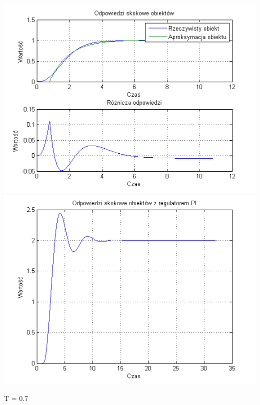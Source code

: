 \documentclass[10pt,a4paper]{article}
\begin{document}
\begin{center}
\includegraphics[scale=1]{images/jeden/skrypt_257.png}\\
\includegraphics[scale=1]{images/jeden/skrypt_258.png}\\
\end{center}
\newpage
T = 0.7
\end{document}
